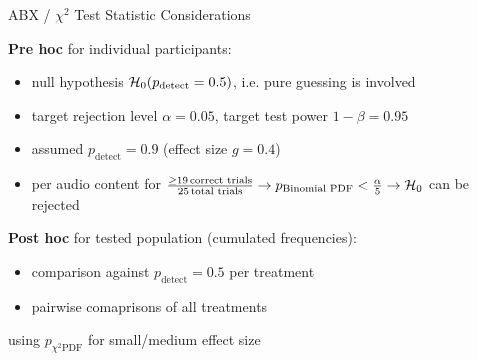 \documentclass[mathserif]{intbeamer}
\begin{document}
\begin{frame}{ABX / $\chi^2$ Test Statistic Considerations}


\textbf{Pre hoc} for individual participants:
\begin{itemize}
\item
null hypothesis $\mathcal{H}_{0}(p_\text{detect}=0.5)$, i.e. pure guessing is involved
\item
target rejection level $\alpha=0.05$,
target test power $1-\beta = 0.95$

\item
assumed $p_\text{detect}=0.9$ (effect size $g=0.4$)
\item
\textcolor{colnonzero}{per audio content}
for $\frac{\geq 19\,\text{correct trials}}{25\,\text{total trials}}
\rightarrow p_\text{Binomial PDF}<\frac{\alpha}{5} \rightarrow\mathcal{H}_{0}$
can be rejected
\end{itemize}
%
\vspace{0.25cm}

\textbf{Post hoc} for tested population (cumulated frequencies):

\begin{itemize}
\item comparison against $p_\text{detect}=0.5$ per treatment
\item pairwise comaprisons of all treatments
\end{itemize}
using $p_{\chi^2 \text{PDF}}$ for small/medium effect size
\end{frame}
%
%
%
\end{document}
